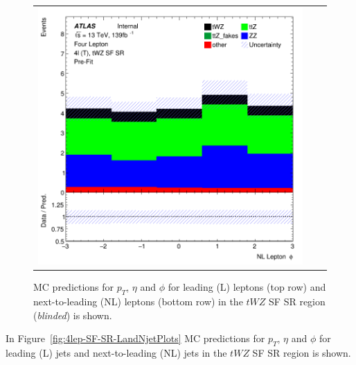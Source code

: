\begin{figure}[htbp]
\begin{tabular}{ccc}
    \includegraphics[width=.3\textwidth]{figures/PreFitPlots/lep4_tWZ_4T_SF_NL_lepton_phi.png} \\

  \end{tabular}
    \caption{MC predictions for $p_{T}$, $\eta$ and $\phi$ for leading (L) leptons (top row) and next-to-leading (NL) leptons (bottom row) in the $tWZ$ SF SR region (\textit{blinded}) is shown.}
  \label{fig:4lep-SF-SR-leptonPlots}
\end{figure}

In Figure~\ref{fig:4lep-SF-SR-LandNjetPlots} MC predictions for $p_{T}$, $\eta$ and $\phi$ for leading (L) jets and next-to-leading (NL) jets in the $tWZ$ SF SR region is shown.

